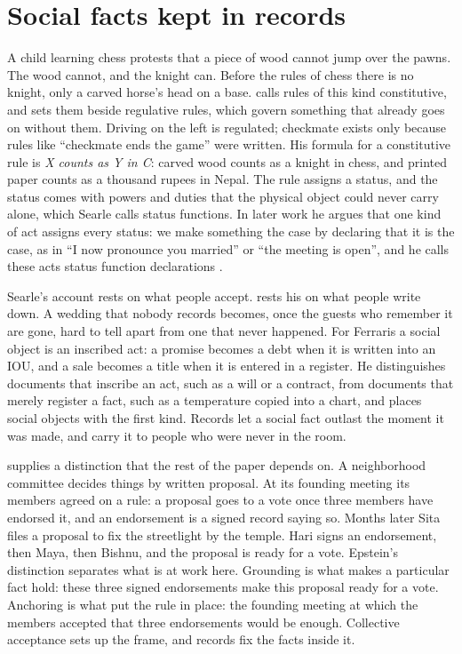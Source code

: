 \section{Social facts kept in records}\label{sec:grounding}

A child learning chess protests that a piece of wood cannot jump over the pawns. The wood cannot,
and the knight can. Before the rules of chess there is no knight, only a carved horse's head on a base.
\citet{searle1995} calls rules of this kind constitutive, and sets them beside regulative rules,
which govern something that already goes on without them. Driving on the left is regulated;
checkmate exists only because rules like ``checkmate ends the game'' were written. His formula for a
constitutive rule is \emph{X counts as Y in C}: carved wood counts as a knight in chess, and printed
paper counts as a thousand rupees in Nepal. The rule assigns a status, and the status comes with
powers and duties that the physical object could never carry alone, which Searle calls status
functions. In later work he argues that one kind of act assigns every status: we make something the
case by declaring that it is the case, as in ``I now pronounce you married'' or ``the meeting is
open'', and he calls these acts status function declarations \citep[pp.~13, 93]{searle2010}.

Searle's account rests on what people accept. \citet{ferraris2013} rests his on what people write
down. A wedding that nobody records becomes, once the guests who remember it are gone, hard to tell
apart from one that never happened. For Ferraris a social object is an inscribed act: a promise
becomes a debt when it is written into an IOU, and a sale becomes a title when it is entered in a
register. He distinguishes documents that inscribe an act, such as a will or a contract, from
documents that merely register a fact, such as a temperature copied into a chart, and places social
objects with the first kind. Records let a social fact outlast the moment it was made, and carry it
to people who were never in the room.

\citet[ch.~6]{epstein2015} supplies a distinction that the rest of the paper depends on. A neighborhood
committee decides things by written proposal. At its founding meeting its members agreed on a rule:
a proposal goes to a vote once three members have endorsed it, and an endorsement is a signed record
saying so. Months later Sita files a proposal to fix the streetlight by the temple. Hari signs an
endorsement, then Maya, then Bishnu, and the proposal is ready for a vote. Epstein's distinction
separates what is at work here. Grounding is what makes a particular fact hold: these three signed endorsements make this
proposal ready for a vote. Anchoring is what put the rule in place: the founding meeting at which
the members accepted that three endorsements would be enough. Collective acceptance sets up the
frame, and records fix the facts inside it.

